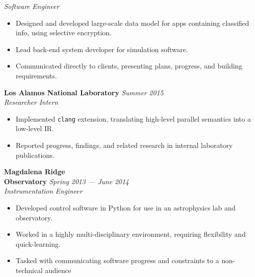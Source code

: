 \documentclass[11pt,a4paper,sans]{article}
\begin{document}
\begin{minipage}[t]{0.6\linewidth}
\textsl{Software Engineer}
\nopagebreak
\begin{itemize}
  \item Designed and developed large-scale data model for apps containing
    classified info, using selective encryption.
  \item Lead back-end system developer for simulation software.
  \item Communicated directly to clients, presenting plans, progress, and
    building requirements.
\end{itemize}
\vspace{1em}
\textbf{Los Alamos National Laboratory} \hfill \textsl{Summer 2015}\\
\textsl{Researcher Intern}
\nopagebreak
\begin{itemize}
  \item Implemented \texttt{clang} extension, translating high-level parallel
    semantics into a low-level IR.
  \item Reported progress, findings, and related research in internal
    laboratory publications.
\end{itemize}
\vspace{1em}
\textbf{Magdalena Ridge \\ Observatory} \hfill \textsl{Spring 2013 --- June 2014}\\
\textsl{Instrumentation Engineer}
\begin{itemize}
  \item Developed control software in Python for use in an astrophysics lab and
    observatory.
  \item Worked in a highly multi-disciplinary environment, requiring
    flexibility and quick-learning.
  \item Tasked with communicating software progress and constraints to a
    non-technical audience
\end{itemize}
\vspace{1em}
\end{minipage}
\end{document}
